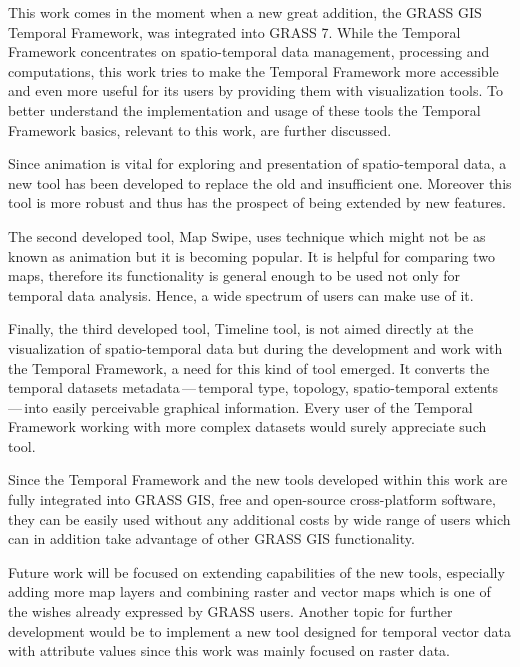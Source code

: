 \documentclass[a4paper,12pt,oneside]{book}
\newcommand{\tf}{Temporal Framework\xspace}
\newcommand{\ms}{Map Swipe\xspace}
\newcommand{\dash}{\mbox{\,---\,}}
\begin{document}
This work comes in the moment when a new great addition, the GRASS GIS \tf, was integrated into GRASS 7.
While the \tf concentrates on spatio-temporal data management, processing and computations, this work
tries to make the \tf more accessible and even more useful for its users by providing them with visualization
tools. To better understand the implementation and usage of these tools
the \tf basics, relevant to this work, are further discussed.

Since animation is vital for exploring and presentation of spatio-temporal data, a new tool has been developed
to replace the old and insufficient one. Moreover this tool is more robust
and thus has the prospect of being extended by new features.

The second developed tool, \ms, uses technique which might not be as known as animation
but it is becoming popular. It is helpful for comparing two maps, therefore its functionality
is general enough to be used not only for temporal data analysis.
Hence, a wide spectrum of users can make use of it.

Finally, the third developed tool, Timeline tool, is not aimed directly at the visualization of spatio-temporal data
but during the development and work with the \tf, a need for this kind of tool emerged.
It converts the temporal datasets metadata\dash temporal type, topology,
spatio-temporal extents\dash into easily perceivable graphical information.
Every user of the \tf working with more complex datasets would surely appreciate such tool.

Since the \tf and the new tools developed within this work are fully integrated into
GRASS GIS, free and open-source cross-platform software, they can be easily used
without any additional costs by wide range of users which can in addition take advantage
of other GRASS GIS functionality.

Future work will be focused on extending capabilities of the new tools,
especially adding more map layers and combining raster and vector maps
which is one of the wishes already expressed by GRASS users.
Another topic for further development would be to implement a new tool
designed for temporal vector data with attribute values since this work
was mainly focused on raster data. 




\newpage
\clearpage
{}
{}
\printbibliography
\end{document}
